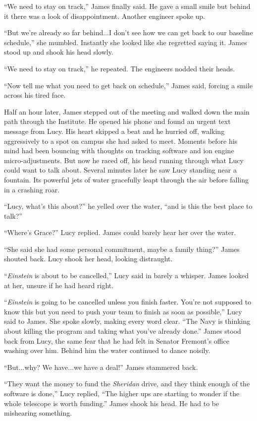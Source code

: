 \documentclass[12pt]{article} %
\begin{document}
``We need to stay on track,'' James finally said. He gave a small smile but behind it there was a look of disappointment. Another engineer spoke up.

``But we're already so far behind...I don't see how we can get back to our baseline schedule,'' she mumbled. Instantly she looked like she regretted saying it. James stood up and shook his head slowly.

``We need to stay on track,'' he repeated. The engineers nodded their heads. 

``Now tell me what you need to get back on schedule,'' James said, forcing a smile across his tired face.

Half an hour later, James stepped out of the meeting and walked down the main path through the Institute. He opened his phone and found an urgent text message from Lucy. His heart skipped a beat and he hurried off, walking aggressively to a spot on campus she had asked to meet. Moments before his mind had been bouncing with thoughts on tracking software and ion engine micro-adjustments. But now he raced off, his head running through what Lucy could want to talk about. Several minutes later he saw Lucy standing near a fountain. Its powerful jets of water gracefully leapt through the air before falling in a crashing roar.

``Lucy, what's this about?'' he yelled over the water, ``and is this the best place to talk?''

``Where's Grace?'' Lucy replied. James could barely hear her over the water.

``She said she had some personal commitment, maybe a family thing?'' James shouted back. Lucy shook her head, looking distraught.

``\textit{Einstein} is about to be cancelled,'' Lucy said in barely a whisper. James looked at her, unsure if he had heard right.

``\textit{Einstein} is going to be cancelled unless you finish faster. You're not supposed to know this but you need to push your team to finish as soon as possible,'' Lucy said to James. She spoke slowly, making every word clear. ``The Navy is thinking about killing the program and taking what you've already done.'' James stood back from Lucy, the same fear that he had felt in Senator Fremont's office washing over him. Behind him the water continued to dance noisily.

``But...why? We have...we have a deal!'' James stammered back.

``They want the money to fund the \textit{Sheridan} drive, and they think enough of the software is done,'' Lucy replied, ``The higher ups are starting to wonder if the whole telescope is worth funding.'' James shook his head. He had to be mishearing something.
\end{document}
